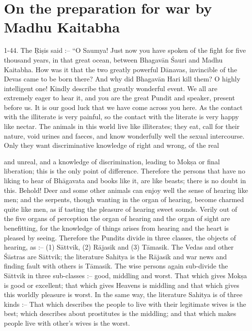 \chapter{On the preparation for war by Madhu Kaitabha}

1-44. The \d{R}i\d{s}is said :-- ``O Saumya! Just now you have spoken of the fight for five thousand years, in that great ocean, between Bhagav\=an \'Sauri and Madhu Kaitabha. How was it that the two greatly powerful D\=anavas, invincible of the Devas came to be born there? And why did Bhagav\=an Hari kill them? O highly intelligent one! Kindly describe that greatly wonderful event. We all are extremely eager to hear it, and you are the great Pundit and speaker, present before us. It is our good luck that we have come across you here. As the contact with the illiterate is very painful, so the contact with the literate is very happy like nectar. The animals in this world live like illiterates; they eat, call for their nature, void urines and faeces, and know wonderfully well the sexual intercourse. Only they want discriminative knowledge of right and wrong, of the real

and unreal, and a knowledge of discrimination, leading to Mok\d{s}a or final liberation; this is the only point of difference. Therefore the persons that have no liking to hear of Bh\=agavata and books like it, are like beasts; there is no doubt in this. Behold! Deer and some other animals can enjoy well the sense of hearing like men; and the serpents, though wanting in the organ of hearing, become charmed quite like men, as if tasting the pleasure of hearing sweet sounds. Verily out of the five organs of perception the organ of hearing and the organ of sight are benefitting, for the knowledge of things arises from hearing and the heart is pleased by seeing. Therefore the Pundits divide in three classes, the objects of hearing, as :-- (1) S\=attvik, (2) R\=ajasik and (3) T\=amasik. The Vedas and other \'S\=astras are S\=attvik; the literature Sahitya is the R\=ajasik and war news and finding fault with others is T\=amasik. The wise persons again sub-divide the S\=attvik in three sub-classes :-- good, middling and worst. That which gives Mok\d{s}a is good or excellent; that which gives Heavens is middling and that which gives this worldly pleasure is worst. In the same way, the literature Sahitya is of three kinds :-- That which describes the people to live with their legitimate wives is the best; which describes about prostitutes is the middling; and that which makes people live with other's wives is the worst.

